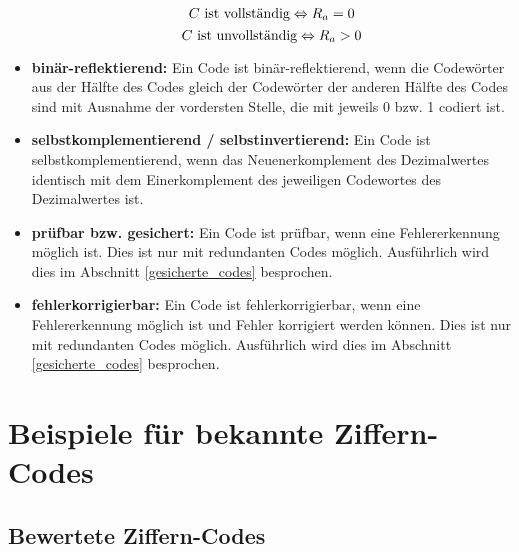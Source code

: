 \begin{itemize}
	$$ C \textnormal{ ist vollständig} \Leftrightarrow R_a = 0 $$
	$$ C \textnormal{ ist unvollständig} \Leftrightarrow R_a > 0 $$
\item
	\textbf{binär-reflektierend:} Ein Code ist binär-reflektierend, wenn die Codewörter aus der Hälfte des Codes gleich der Codewörter der anderen Hälfte des Codes sind mit Ausnahme der vordersten Stelle, die mit jeweils 0 bzw. 1 codiert ist.
\item
	\textbf{selbstkomplementierend / selbstinvertierend:} Ein Code ist selbstkomplementierend, wenn das Neuenerkomplement des Dezimalwertes identisch mit dem Einerkomplement des jeweiligen Codewortes des Dezimalwertes ist.
\item
	\textbf{prüfbar bzw. gesichert:} Ein Code ist prüfbar, wenn eine Fehlererkennung möglich ist. Dies ist nur mit redundanten Codes möglich. Ausführlich wird dies im Abschnitt \ref{gesicherte_codes} besprochen.
\item
	\textbf{fehlerkorrigierbar:} Ein Code ist fehlerkorrigierbar, wenn eine Fehlererkennung möglich ist und Fehler korrigiert werden können. Dies ist nur mit redundanten Codes möglich. Ausführlich wird dies im Abschnitt \ref{gesicherte_codes} besprochen.
\end{itemize}

\section{Beispiele für bekannte Ziffern-Codes}
\subsection*{Bewertete Ziffern-Codes}

